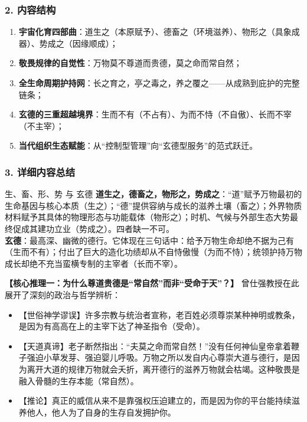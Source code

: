 \subsubsection{2. 内容结构}
\begin{enumerate}
    \item \textbf{宇宙化育四部曲}：道生之（本原赋予）、德畜之（环境滋养）、物形之（具象成器）、势成之（因缘顺成）；
    \item \textbf{敬畏规律的自觉性}：万物莫不尊道而贵德，莫之命而常自然；
    \item \textbf{全生命周期护持网}：长之育之，亭之毒之，养之覆之——从成熟到庇护的完整链条；
    \item \textbf{玄德的三重超越境界}：生而不有（不占有）、为而不恃（不自傲）、长而不宰（不主宰）；
    \item \textbf{当代组织生态赋能}：从“控制型管理”向“玄德型服务”的范式跃迁。
\end{enumerate}

\subsubsection{3. 详细内容总结}

\begin{ConceptBox}{生、畜、形、势 与 玄德}
\textbf{道生之，德畜之，物形之，势成之}：“道”赋予万物最初的生命基因与核心本质（生之）；“德”提供容纳与成长的滋养土壤（畜之）；外界物质材料赋予其具体的物理形态与功能载体（物形之）；时机、气候与外部生态大势最终促成其建功立业（势成之）。四者缺一不可。\\
\textbf{玄德}：最高深、幽微的德行。它体现在三句话中：给予万物生命却绝不据为己有（生而不有）；付出了巨大的造化功绩却从不自恃傲慢（为而不恃）；统领护持万物成长却绝不充当蛮横专制的主宰者（长而不宰）。
\end{ConceptBox}

\noindent\textbf{【核心推理一：为什么尊道贵德是“常自然”而非“受命于天”？】}
曾仕强教授在此展开了深刻的政治与哲学辨析：
\begin{itemize}
    \item 【世俗神学谬误】许多宗教与统治者宣称，老百姓必须尊崇某种神明或教条，是因为有高高在上的主宰下达了神圣指令（受命）。
    \item 【天道真谛】老子断然指出：“夫莫之命而常自然！”没有任何神仙皇帝拿着鞭子强迫小草发芽、强迫婴儿呼吸。万物之所以发自内心尊崇大道与德行，是因为离开大道的规律万物就会夭折，离开德行的滋养万物就会枯竭。这种敬畏是融入骨髓的生存本能（常自然）。
    \item 【推论】真正的威信从来不是靠强权压迫建立的，而是因为你的平台能持续滋养他人，他人为了自身的生存自发拥护你。
\end{itemize}

